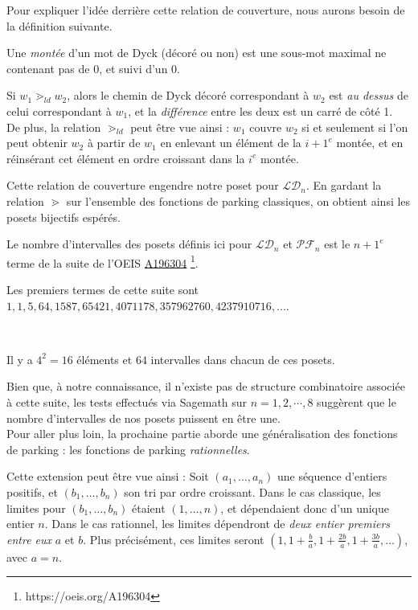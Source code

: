 Pour expliquer l'idée derrière cette relation de couverture, nous aurons
besoin de la définition suivante.

\begin{definition}[Montée]
    Une \emph{montée} d'un mot de Dyck (décoré ou non) est une sous-mot
    maximal ne contenant pas de 0, et suivi d'un 0.
\end{definition}

\begin{rem}
    Si $w_1 \gtrdot_{ld} w_2$, alors le chemin de Dyck décoré correspondant
    à $w_2$ est \emph{au dessus} de celui correspondant à $w_1$,
    et la \emph{différence} entre les deux est un carré de côté 1.\\
    De plus, la relation $\gtrdot_{ld}$ peut être vue ainsi :
    $w_1$ couvre $w_2$ si et seulement si l'on peut obtenir $w_2$ à partir
    de $w_1$ en enlevant un élément de la $i + 1^{e}$ montée, 
    et en réinsérant cet élément en ordre croissant dans la $i^{e}$
    montée.
\end{rem}

Cette relation de couverture engendre notre poset pour $\mathcal{LD}_n$.
En gardant la relation $\gtrdot$ sur l'ensemble des fonctions de parking
classiques, on obtient ainsi les posets bijectifs espérés.


\begin{conj}
    Le nombre d'intervalles des posets définis ici pour $\mathcal{LD}_n$
    et $\mathcal{PF}_n$ est le $n+1^{e}$ terme de la suite de l'OEIS
    \href{https://oeis.org/A196304}{A196304}
    \footnote{https://oeis.org/A196304}.
\end{conj}

Les premiers termes de cette suite sont $1, 1, 5, 64, 1587,
65421, 4071178, 357962760, 4237910716, ...$.

\newpage
\begin{expl}
    ~\\
    \begin{center}
        
        Il y a $4^2 = 16$ éléments et $64$ intervalles dans chacun de ces
        posets.
    \end{center}
\end{expl}

Bien que, à notre connaissance, il n'existe pas de structure combinatoire
associée à cette suite, les tests effectués via Sagemath sur
$n = 1, 2, \cdots, 8$ suggèrent que le nombre d'intervalles de nos posets
puissent en être une.\\

Pour aller plus loin, la prochaine partie aborde une généralisation des
fonctions de parking : les fonctions de parking \emph{rationnelles}.

Cette extension peut être vue ainsi :
Soit $(a_1, \ldots, a_n)$ une séquence d'entiers positifs,
et $(b_1, \ldots, b_n)$ son tri par ordre croissant.
Dans le cas classique, les limites pour $(b_1, \ldots, b_n)$
étaient $(1, \ldots, n)$, et dépendaient donc d'un unique entier $n$.
Dans le cas rationnel, les limites dépendront de \emph{deux entier
premiers entre eux} $a$ et $b$.
Plus précisément, ces limites seront $(1, 1 + \frac{b}{a},
1 + \frac{2b}{a}, 1 + \frac{3b}{a}, \ldots)$, avec $a = n$. 